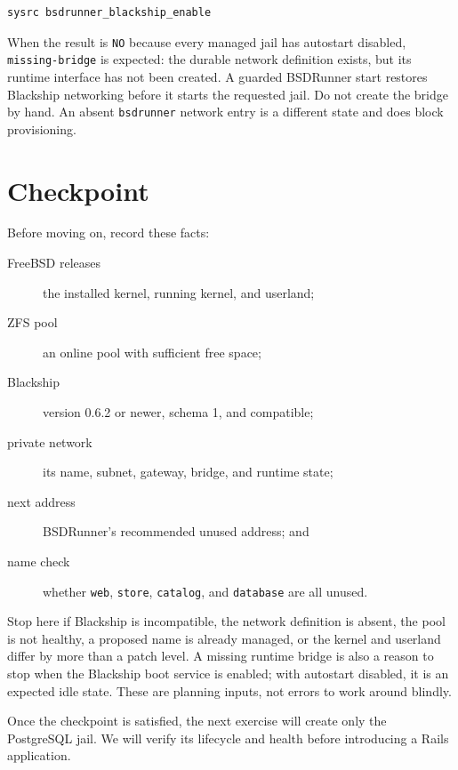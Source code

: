 \begin{lstlisting}[language=sh]
sysrc bsdrunner_blackship_enable
\end{lstlisting}

When the result is \texttt{NO} because every managed jail has autostart disabled,
\texttt{missing-bridge} is expected: the durable network definition exists, but
its runtime interface has not been created. A guarded BSDRunner start restores
Blackship networking before it starts the requested jail. Do not create the
bridge by hand. An absent \texttt{bsdrunner} network entry is a different state
and does block provisioning.

\section{Checkpoint}

Before moving on, record these facts:

\begin{description}
  \item[FreeBSD releases] the installed kernel, running kernel, and userland;
  \item[ZFS pool] an online pool with sufficient free space;
  \item[Blackship] version 0.6.2 or newer, schema 1, and compatible;
  \item[private network] its name, subnet, gateway, bridge, and runtime state;
  \item[next address] BSDRunner's recommended unused address; and
  \item[name check] whether \texttt{web}, \texttt{store}, \texttt{catalog}, and
    \texttt{database} are all unused.
\end{description}

Stop here if Blackship is incompatible, the network definition is absent, the
pool is not healthy, a proposed name is already managed, or the kernel and
userland differ by more than a patch level. A missing runtime bridge is also a
reason to stop when the Blackship boot service is enabled; with autostart
disabled, it is an expected idle state. These are planning inputs, not errors to
work around blindly.

Once the checkpoint is satisfied, the next exercise will create only the
PostgreSQL jail. We will verify its lifecycle and health before introducing a
Rails application.
